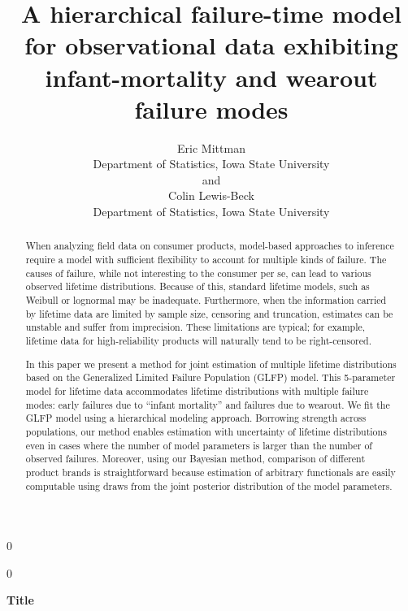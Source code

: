 \documentclass[12pt]{article}
\newcommand{\blind}{0}
\begin{document}
\def\spacingset#1{\renewcommand{\baselinestretch}%
{#1}\small\normalsize} \spacingset{1}



\blind
{
  \title{\bf A hierarchical failure-time model for observational data exhibiting infant-mortality and wearout failure modes}
  \author{Eric Mittman \\
    Department of Statistics, Iowa State University\\
    and \\
    Colin Lewis-Beck \\
    Department of Statistics, Iowa State University}
  \maketitle
} \fi

\blind
{
  \bigskip
  \bigskip
  \bigskip
  \begin{center}
    {\LARGE\bf Title}
\end{center}
  \medskip
} \fi

\bigskip
\begin{abstract}
When analyzing field data on consumer products, model-based approaches to inference require a model with sufficient flexibility to account for multiple kinds of failure. The causes of failure, while not interesting to the consumer per se, can lead to various observed lifetime distributions. Because of this, standard lifetime models, such as Weibull or lognormal may be inadequate. 
Furthermore, when the information carried by lifetime data are limited by sample size, censoring and truncation, estimates can be unstable and suffer from imprecision. These limitations are typical; for example, lifetime data for high-reliability products will naturally tend to be right-censored.


In this paper we present a method for joint estimation of multiple lifetime distributions based on the Generalized Limited Failure Population (GLFP) model. This 5-parameter model for lifetime data accommodates lifetime distributions with multiple failure modes:  early failures due to ``infant mortality'' and failures due to wearout. We fit the GLFP model using a hierarchical modeling approach.  Borrowing strength across populations, our method enables estimation with uncertainty of lifetime distributions even in cases where the number of model parameters is larger than the number of observed failures.  Moreover, using our Bayesian method, comparison of different product brands is straightforward because estimation of arbitrary functionals are easily computable using draws from the joint posterior distribution of the model parameters.
\end{abstract}
\end{document}
